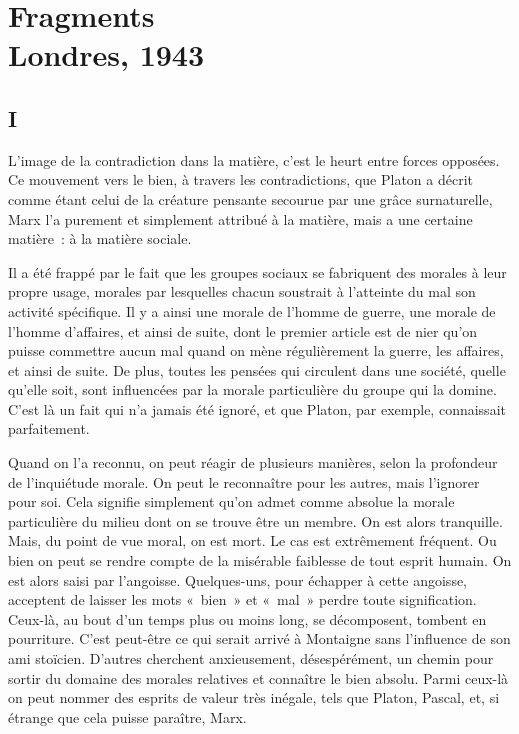 \documentclass[french,twoside]{book} %
\begin{document}
\begin{center}
\end{center}
\section[Fragments. Londres, 1943]{Fragments \\
Londres, 1943}\renewcommand{\leftmark}{Fragments \\
Londres, 1943}

\noindent \par
\subsection[I]{I}
\noindent L'image de la contradiction dans la matière, c'est le heurt entre forces opposées. Ce mouvement vers le bien, à travers les contradictions, que Platon a décrit comme étant celui de la créature pensante secourue par une grâce surnaturelle, Marx l'a purement et simplement attribué à la matière, mais a une certaine matière : à la matière sociale.\par
Il a été frappé par le fait que les groupes sociaux se fabriquent des morales à leur propre usage, morales par lesquelles chacun soustrait à l'atteinte du mal son activité spécifique. Il y a ainsi une morale de l'homme de guerre, une morale de l'homme d'affaires, et ainsi de suite, dont le premier article est de nier qu'on puisse commettre aucun mal quand on mène régulièrement la guerre, les affaires, et ainsi de suite. De plus, toutes les pensées qui circulent dans une société, quelle qu'elle soit, sont influencées par la morale particulière du groupe qui la domine. C'est là un fait qui n'a jamais été ignoré, et que Platon, par exemple, connaissait parfaitement.\par
Quand on l'a reconnu, on peut réagir de plusieurs manières, selon la profondeur de l'inquiétude morale. On peut le reconnaître pour les autres, mais l'ignorer pour soi. Cela signifie simplement qu'on admet comme absolue la morale particulière du milieu dont on se trouve être un membre. On est alors tranquille. Mais, du point de vue moral, on est mort. Le cas est extrêmement fréquent. Ou bien on peut se rendre compte de la misérable faiblesse de tout esprit humain. On est alors saisi par l'angoisse. Quelques-uns, pour échapper à cette angoisse, acceptent de laisser les mots « bien » et « mal » perdre toute signification. Ceux-là, au bout d'un temps plus ou moins long, se décomposent, tombent en pourriture. C'est peut-être ce qui serait arrivé à Montaigne sans l'influence de son ami stoïcien. D'autres cherchent anxieusement, désespérément, un chemin pour sortir du domaine des morales relatives et connaître le bien absolu. Parmi ceux-là on peut nommer des esprits de valeur très inégale, tels que Platon, Pascal, et, si étrange que cela puisse paraître, Marx.\par
\end{document}
